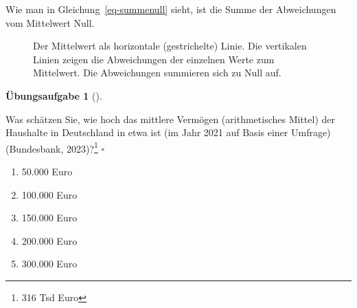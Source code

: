 \documentclass[
  letterpaper,
  twoside,
  open=any]{scrbook}
\providecommand{\tightlist}{%
  \setlength{\itemsep}{0pt}\setlength{\parskip}{0pt}}\usepackage{longtable,booktabs,array}
\theoremstyle{definition}
\newtheorem{exercise}{Übungsaufgabe}[chapter]
\theoremstyle{definition}
\theoremstyle{definition}
\theoremstyle{remark}
\begin{document}
Wie man in Gleichung~\ref{eq-summenull} sieht, ist die Summe der
Abweichungen vom Mittelwert Null.

\begin{figure}


\caption{\label{fig-mw1}Der Mittelwert als horizontale (gestrichelte)
Linie. Die vertikalen Linien zeigen die Abweichungen der einzelnen Werte
zum Mittelwert. Die Abweichungen summieren sich zu Null auf.}

\end{figure}%

\begin{exercise}[]\protect\hypertarget{exr-mw-wealth1}{}\label{exr-mw-wealth1}

Was schätzen Sie, wie hoch das mittlere Vermögen (arithmetisches Mittel)
der Haushalte in Deutschland in etwa ist (im Jahr 2021 auf Basis einer
Umfrage) (Bundesbank, 2023)?\footnote{316 Tsd Euro} \(\square\)

\begin{enumerate}
\def\labelenumi{\alph{enumi})}
\tightlist
\item
  50.000 Euro
\item
  100.000 Euro
\item
  150.000 Euro
\item
  200.000 Euro
\item
  300.000 Euro
\end{enumerate}

\end{exercise}
\end{document}
